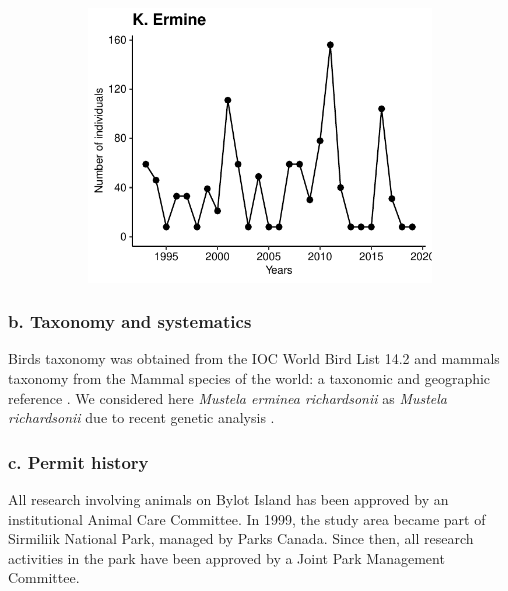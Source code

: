 \documentclass[a4paper,twoside,12pt]{article}
\begin{document}
\begin{figure}[h]
\begin{subfigure}{0.45\textwidth}
    \includegraphics[width=\linewidth]{figures/species_temporal_series/Ermine.pdf}
  \end{subfigure}
\end{figure}
\newpage

\newpage
                        
                        \subsubsection*{b. Taxonomy and systematics}
Birds taxonomy was obtained from the IOC World Bird List 14.2 \citep{gill2024} and mammals taxonomy from the Mammal species of the world: a taxonomic and geographic reference \citep{wilson2005}. We considered here \textit{Mustela erminea richardsonii} as \textit{Mustela richardsonii} due to recent genetic analysis \citep{colella2021}.
                        
                        \subsubsection*{c. Permit history}
All research involving animals on Bylot Island has been approved by an institutional Animal Care Committee. In 1999, the study area became part of Sirmiliik National Park, managed by Parks Canada. Since then, all research activities in the park have been approved by a Joint Park Management Committee.
      
\end{document}
